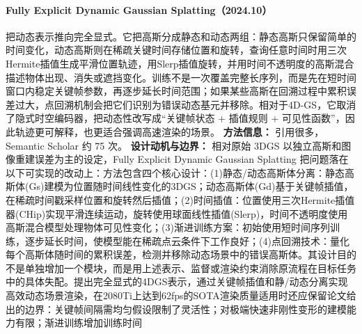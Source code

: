 \paragraph{Fully Explicit Dynamic Gaussian Splatting（2024.10）\cite{2410_15629}}
把动态表示推向完全显式。它把高斯分成静态和动态两组：静态高斯只保留简单的时间变化，动态高斯则在稀疏关键时间存储位置和旋转，查询任意时间时用三次Hermite插值生成平滑位置轨迹，用Slerp插值旋转，并用时间不透明度的高斯混合描述物体出现、消失或遮挡变化。训练不是一次覆盖完整长序列，而是先在短时间窗口内稳定关键帧参数，再逐步延长时间范围；如果某些高斯在回溯过程中累积误差过大，点回溯机制会把它们识别为错误动态基元并移除。相对于4D-GS，它取消了隐式时空编码器，把动态性改写成“关键帧状态 + 插值规则 + 可见性函数”，因此轨迹更可解释，也更适合强调高速渲染的场景。
\textbf{方法信息：} 引用很多，Semantic Scholar 约 75 次。
\textbf{设计动机与边界：} 相对原始 3DGS 以独立高斯和图像重建误差为主的设定，Fully Explicit Dynamic Gaussian Splatting 把问题落在以下可实现的改动上：方法包含四个核心设计：(1)静态/动态高斯体分离：静态高斯体(Gs)建模为位置随时间线性变化的3DGS；动态高斯体(Gd)基于关键帧插值，在稀疏时间戳采样位置和旋转然后插值；(2)时间插值：位置使用三次Hermite插值器(CHip)实现平滑连续运动，旋转使用球面线性插值(Slerp)，时间不透明度使用高斯混合模型处理物体可见性变化；(3)渐进训练方案：初始使用短时间序列训练，逐步延长时间，使模型能在稀疏点云条件下工作良好；(4)点回溯技术：量化每个高斯体随时间的累积误差，检测并移除动态场景中的错误高斯体。其设计目的不是单独增加一个模块，而是用上述表示、监督或渲染约束消除原流程在目标任务中的具体失配。提出完全显式的4DGS表示，通过关键帧插值和静/动态分离实现高效动态场景渲染，在2080Ti上达到62fps的SOTA渲染质量适用时还应保留论文给出的边界：关键帧间隔需均匀假设限制了灵活性；对极端快速非刚性变形的建模能力有限；渐进训练增加训练时间

